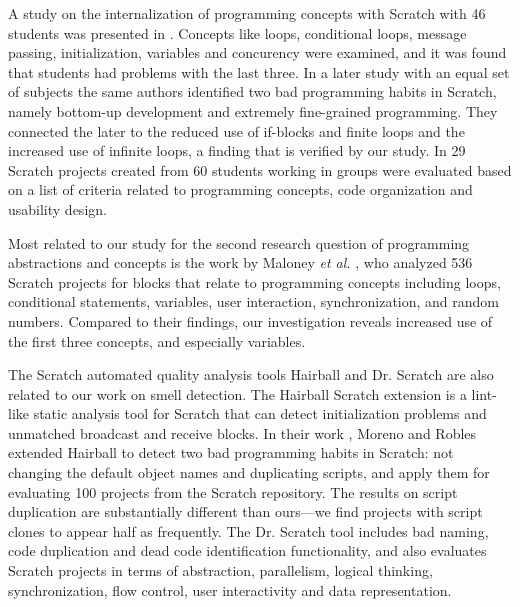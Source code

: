 \documentclass{sig-alternate}
\begin{document}
A study on the internalization of programming concepts with Scratch with 46 students was presented in \cite{meerbaum-salant_learning_2010}. Concepts like loops, conditional loops, message passing, initialization, variables and concurency were examined, and it was found that students had problems with the last three. In a later study with an equal set of subjects \cite{Meerbaum_habits_2011} the same authors identified two bad programming habits in Scratch, namely bottom-up development and extremely fine-grained programming. They connected the later to the reduced use of if-blocks and finite loops and the increased use of infinite loops, a finding that is verified by our study. In \cite{wilson_evaluation_2012} 29 Scratch projects created from 60 students working in groups were evaluated based on a list of criteria related to programming concepts, code organization and usability design.

Most related to our study for the second research question of programming abstractions and concepts is the work by Maloney \emph{et al.} \cite{Maloney_2008}, who analyzed 536 Scratch projects for blocks that relate to programming concepts including loops, conditional statements, variables, user interaction, synchronization, and random numbers. Compared to their findings, our investigation reveals increased use of the first three concepts, and especially variables.

The Scratch automated quality analysis tools Hairball \cite{boe_hairball:_2013} and Dr. Scratch \cite{moreno-leon_dr._2015} are also related to our work on smell detection. The Hairball Scratch extension is a lint-like static analysis tool for Scratch that can detect initialization problems and unmatched broadcast and receive blocks. In their work \cite{moreno_automatic_2014}, Moreno and Robles extended Hairball to detect two bad programming habits in Scratch: not changing the default object names and duplicating scripts, and apply them for evaluating 100 projects from the Scratch repository. The results on script duplication are substantially different than ours---we find projects with script clones to appear half as frequently. The Dr. Scratch tool \cite{moreno-leon_dr._2015} includes bad naming, code duplication and dead code identification functionality, and also evaluates Scratch projects in terms of abstraction, parallelism, logical thinking, synchronization, flow control, user interactivity and data representation.
\end{document}
